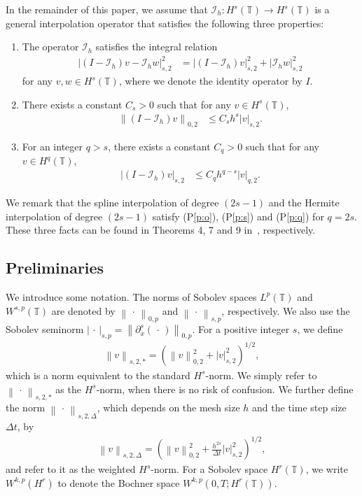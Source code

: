 \documentclass[10pt,a4paper,tbtags,leqno]{amsart}
\theoremstyle{definition}
\numberwithin{equation}{section}
\def\norm#1#2{\left\|#2\right\|_{#1}}
\def\snorm#1#2{\left|#2\right|_{#1}}
\begin{document}
In the remainder of this paper, we assume that $ \mathcal{I}_{h}: H^s(\mathbb{T}) \to H^s(\mathbb{T}) $ is a general interpolation operator that satisfies the following three properties: 
\begin{enumerate}[(P1)] 
  \item The operator $ \mathcal{I}_{h} $ satisfies the integral relation \label{p:o} 
  \begin{align} 
    \snorm{s, 2}{(I - \mathcal{I}_{h}) v - \mathcal{I}_{h} w}^2 & = \snorm{s, 2}{(I - \mathcal{I}_{h}) v}^2 + \snorm{s, 2}{\mathcal{I}_{h} w}^2 
  \end{align} 
  for any $ v, w \in H^s (\mathbb{T}) $, where we denote the identity operator by $ I $. 
  \item There exists a constant $ C_s > 0 $ such that for any $ v \in H^s (\mathbb{T}) $, \label{p:s}
  \begin{align}
    \norm{0, 2}{(I - \mathcal{I}_{h}) v} & \leq C_s h^s \snorm{s, 2}{v}. \label{interpolation_error_s}
  \end{align}
  \item For an integer $ q > s $, there exists a constant $ C_q > 0 $ such that for any $ v \in H^q (\mathbb{T}) $, \label{p:q} 
  \begin{align} 
    \snorm{s, 2}{(I - \mathcal{I}_{h}) v} & \leq C_q h^{q - s} \snorm{q, 2}{v}. 
  \end{align} 
\end{enumerate} 

We remark that the spline interpolation of degree $ (2 s - 1) $ and the Hermite interpolation of degree $ (2 s - 1) $ satisfy (P\ref{p:o}), (P\ref{p:s}) and (P\ref{p:q}) for $q = 2s$. These three facts can be found in Theorems 4, 7 and 9 in~\cite{SV67}, respectively. 

\subsection{Preliminaries} 
\label{ss:pre} 

We introduce some notation. The norms of Sobolev spaces $ L^p (\mathbb{T}) $ and $ W^{s, p} (\mathbb{T}) $ are denoted by $ \norm{0, p}{\, \cdot \,} $ and $ \norm{s, p}{\, \cdot \,} $, respectively. We also use the Sobolev seminorm $ \snorm{s, p}{\, \cdot \,} = \norm{0, p}{\partial_x^s (\, \cdot \,)} $. For a positive integer $ s $, we define 
\begin{align} 
  \norm{s, 2, \ast}{v} = \left(\norm{0,2}{v}^2 + \snorm{s,2}{v}^2\right)^{1/2}, 
\end{align} 
which is a norm equivalent to the standard $ H^s $-norm. We simply refer to $ \norm{s, 2, \ast}{\, \cdot \,} $ as the $ H^s $-norm, when there is no risk of confusion. We further define the norm $ \norm{s, 2, \Delta}{\,\cdot\,} $, which depends on the mesh size $ h $ and the time step size $ \Delta t $, by 
\begin{align} 
  \norm{s, 2, \Delta}{v} = \left(\norm{0, 2}{v}^2 + \frac{h^{2s}}{\Delta t} \snorm{s, 2}{v}^2 \right)^{1/2}, \label{nsd} 
\end{align} 
and refer to it as the weighted $ H^s $-norm. For a Sobolev space $ H^r (\mathbb{T}) $, we write $W^{k,p} (H^r)$ to denote the Bochner space $W^{k,p}(0,T; H^r(\mathbb{T}))$. 
\end{document}
